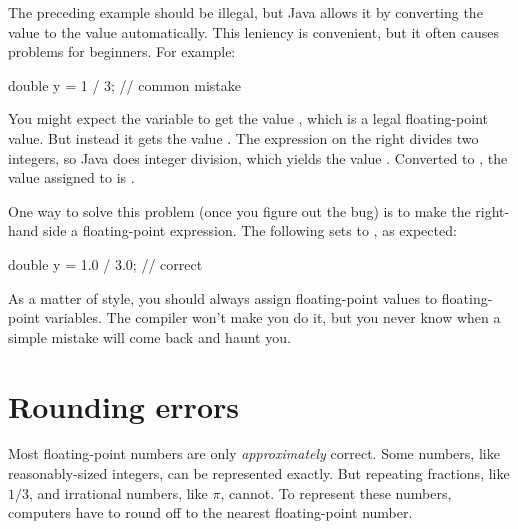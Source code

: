 The preceding example should be illegal, but Java allows it by converting the  value  to the  value  automatically.
This leniency is convenient, but it often causes problems for beginners.
For example:

\begin{code}
double y = 1 / 3;  // common mistake
\end{code}


You might expect the variable  to get the value , which is a legal floating-point value.
But instead it gets the value .
The expression on the right divides two integers, so Java does integer division, which yields the  value .
Converted to , the value assigned to  is .

One way to solve this problem (once you figure out the bug) is to make the right-hand side a floating-point expression.
The following sets  to , as expected:

\begin{code}
double y = 1.0 / 3.0;  // correct
\end{code}

As a matter of style, you should always assign floating-point values to floating-point variables.
The compiler won't make you do it, but you never know when a simple mistake will come back and haunt you.


\section{Rounding errors}


Most floating-point numbers are only {\em approximately} correct.
Some numbers, like reasonably-sized integers, can be represented exactly.
But repeating fractions, like $1/3$, and irrational numbers, like $\pi$, cannot.
To represent these numbers, computers have to round off to the nearest floating-point number.


